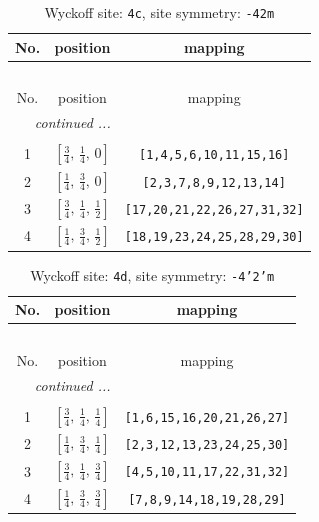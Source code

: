 \documentclass[fleqn,8pt]{jsarticle}
\begin{document}
\renewcommand{\arraystretch}{1.2}
\begin{longtable}{ccc}
\caption{Wyckoff site: {\tt 4c}, site symmetry: {\tt -42m}}
 \\
 \hline \hline
No. & position & mapping \\ \hline \endfirsthead

\multicolumn{2}{l}{\tablename\ \thetable{}} \\
 \hline \hline
No. & position & mapping \\ \hline \endhead

 \hline \hline
\multicolumn{2}{r}{\footnotesize\it continued ...} \\ \endfoot

 \hline \hline
\multicolumn{2}{r}{} \\ \endlastfoot

1 & $\left[ \frac{3}{4},\, \frac{1}{4},\, 0 \right]$ & {\tt [1,4,5,6,10,11,15,16]} \\ \hline
2 & $\left[ \frac{1}{4},\, \frac{3}{4},\, 0 \right]$ & {\tt [2,3,7,8,9,12,13,14]} \\ \hline
3 & $\left[ \frac{3}{4},\, \frac{1}{4},\, \frac{1}{2} \right]$ & {\tt [17,20,21,22,26,27,31,32]} \\ \hline
4 & $\left[ \frac{1}{4},\, \frac{3}{4},\, \frac{1}{2} \right]$ & {\tt [18,19,23,24,25,28,29,30]} \\
\end{longtable}
\renewcommand{\arraystretch}{1.2}
\begin{longtable}{ccc}
\caption{Wyckoff site: {\tt 4d}, site symmetry: {\tt -4'2'm}}
 \\
 \hline \hline
No. & position & mapping \\ \hline \endfirsthead

\multicolumn{2}{l}{\tablename\ \thetable{}} \\
 \hline \hline
No. & position & mapping \\ \hline \endhead

 \hline \hline
\multicolumn{2}{r}{\footnotesize\it continued ...} \\ \endfoot

 \hline \hline
\multicolumn{2}{r}{} \\ \endlastfoot

1 & $\left[ \frac{3}{4},\, \frac{1}{4},\, \frac{1}{4} \right]$ & {\tt [1,6,15,16,20,21,26,27]} \\ \hline
2 & $\left[ \frac{1}{4},\, \frac{3}{4},\, \frac{1}{4} \right]$ & {\tt [2,3,12,13,23,24,25,30]} \\ \hline
3 & $\left[ \frac{3}{4},\, \frac{1}{4},\, \frac{3}{4} \right]$ & {\tt [4,5,10,11,17,22,31,32]} \\ \hline
4 & $\left[ \frac{1}{4},\, \frac{3}{4},\, \frac{3}{4} \right]$ & {\tt [7,8,9,14,18,19,28,29]} \\
\end{longtable}
\end{document}
